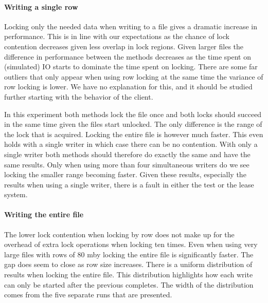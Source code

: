 \paragraph{Writing a single row}
Locking only the needed data when writing to a file gives a dramatic increase in performance. This is in line with our expectations as the chance of lock contention decreases given less overlap in lock regions. Given larger files the difference in performance between the methods decreases as the time spent on (simulated) IO starts to dominate the time spent on locking. There are some far outliers that only appear when using row locking at the same time the variance of row locking is lower. We have no explanation for this, and it should be studied further starting with the behavior of the client.

In this experiment both methods lock the file once and both locks should succeed in the same time given the files start unlocked. The only difference is the range of the lock that is acquired. Locking the entire file is however much faster. This even holds with a single writer in which case there can be no contention. With only a single writer both methods should therefore do exactly the same and have the same results. Only when using more than four simultaneous writers do we see locking the smaller range becoming faster. Given these results, especially the results when using a single writer, there is a fault in either the test or the lease system.
%
\paragraph{Writing the entire file}
The lower lock contention when locking by row does not make up for the overhead of extra lock operations when locking ten times. Even when using very large files with rows of 80 \ac{mby} locking the entire file is significantly faster. The gap does seem to close as row size increases. There is a uniform distribution of results when locking the entire file. This distribution highlights how each write can only be started after the previous completes. The width of the distribution comes from the five separate runs that are presented.
